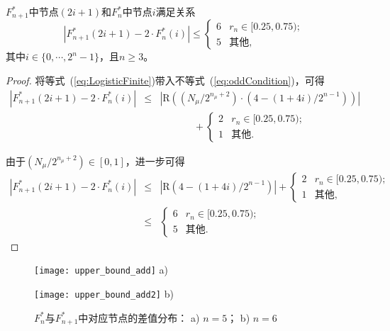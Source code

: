 \begin{Corollary}
\label{coro:logisticoddUpper}
$F^*_{n+1}$中节点$(2i+1)$和$F^*_{n}$中节点$i$满足关系
\begin{equation*}
\left|F^*_{n+1}(2i+1)-2\cdot F^*_n(i)\right|\le
\begin{cases}
6  & r_n \in [0.25, 0.75);\nonumber\\
5  & \mbox{其他},
\end{cases}
\end{equation*}
其中$i\in \{0, \cdots, 2^n-1\}$，且$n\ge 3$。
\end{Corollary}

\begin{proof}
将等式~(\ref{eq:LogisticFinite})带入不等式~(\ref{eq:oddCondition})，可得
\begin{eqnarray*}
\left|F^*_{n+1}(2i+1)-2\cdot F^*_n(i)\right|
& \le & \left|\mathrm{R}\left( \left(N_{\mu}/2^{n_\mu+2}\right)
                 \cdot \left(4-(1+4i)/2^{n-1}\right)\right)\right| \\
&     & \hspace{1cm}
\quad+\begin{cases}
2  & r_n \in [0.25, 0.75); \\
1  & \mbox{其他}.
\end{cases}
\end{eqnarray*}

由于$(N_{\mu}/2^{n_\mu+2})\in [0, 1]$，进一步可得
\begin{eqnarray}
\left|F^*_{n+1}(2i+1)-2\cdot F^*_n(i)\right|
& \le & \left|\mathrm{R}\left(4-(1+4i)/2^{n-1}\right)\right|+
\begin{cases}
2  & r_n \in [0.25, 0.75);\nonumber\\
1  & \mbox{其他},
\end{cases}\\
& \le &
\begin{cases}
6  & r_n \in [0.25, 0.75);\nonumber\\
5  & \mbox{其他}.
\end{cases}
\end{eqnarray}\qedsymbol
\end{proof}

\begin{figure}[!htb]
\centering
\begin{minipage}{\TwoImW}
\centering
\texttt{[image: upper\_bound\_add]}
a)
\hspace{1mm}
\end{minipage}
\begin{minipage}{\TwoImW}
\centering
\texttt{[image: upper\_bound\_add2]}
b)
\end{minipage}
\caption{$F^*_n$与$F^*_{n+1}$中对应节点的差值分布： a) $n=5$； b) $n=6$}
\label{fig:upperbound}
\end{figure}

